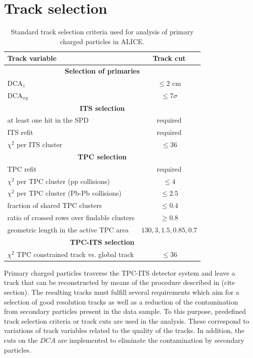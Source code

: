 \documentclass[12pt,a4paper]{report}
\begin{document}
\section{Track selection}
\label{TrackSelection}
\begin{table}[tb!]
\renewcommand{\arraystretch}{1.5}
\centering
\begin{tabular}{l c}
\toprule
\rowcolor{headerBlue}  \textbf{Track variable} &  \textbf{Track cut} \\
\midrule
\multicolumn{2}{c}{\textbf{Selection of primaries}} \\
\midrule
$\text{DCA}_{z}$ & $\leq 2 $ cm\\
$\text{DCA}_{xy}$ & $\leq 7\sigma$ \\
\midrule
\multicolumn{2}{c}{\textbf{ITS selection}} \\
\midrule
at least one hit in the SPD & required \\
ITS refit &  required\\
$\chi^2$ per ITS cluster  & $\leq 36$ \\
\midrule
\multicolumn{2}{c}{\textbf{TPC selection}} \\
\midrule
TPC refit &  required\\
$\chi^2$ per TPC cluster (pp collisions) & $\leq 4$ \\
$\chi^2$ per TPC cluster (Pb-Pb collisions) & $\leq 2.5$ \\
fraction of shared  TPC clusters&  $\leq 0.4$\\
ratio of crossed rows over findable clusters  & $\geq 0.8$ \\
geometric length in the active TPC area & $130, 3, 1.5, 0.85, 0.7$ \\
\midrule
\multicolumn{2}{c}{\textbf{TPC-ITS selection}} \\
\midrule
$\chi^2$ TPC constrained track vs. global track  & $\leq 36$ \\
\bottomrule
\end{tabular}
\caption{Standard track selection criteria used for analysis of primary charged particles in ALICE.}
\label{tab:Cuts}
\end{table}
Primary charged particles traverse the TPC-ITS detector system and leave a track that can be reconstructed by means of the procedure described in (cite section). The resulting tracks must fulfill several requirements which aim for a selection of good resolution tracks as well as a reduction of the contamination from secondary particles present in the data sample. To this purpose, predefined track selection criteria or track cuts are used in the analysis. These correspond to variations of track variables related to the quality of the tracks. In addition, the cuts on the $DCA$ are implemented to eliminate the contamination by secondary particles.\\
\end{document}
